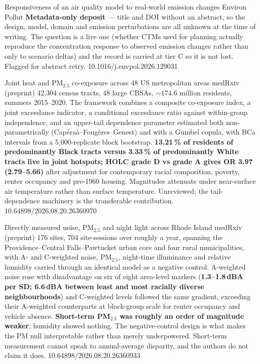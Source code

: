 \documentclass[10pt]{article}
\begin{document}
{Responsiveness of an air quality model to real-world emission changes}
{Environ Pollut}
{\textbf{Metadata-only deposit} --- title and DOI without an abstract, so the design,
model, domain and emission perturbations are all unknown at the time of writing. The
question is a live one (whether CTMs used for planning actually reproduce the
concentration response to observed emission changes rather than only to scenario
deltas) and the record is carried at tier C so it is not lost. Flagged for
abstract retry.}
{10.1016/j.envpol.2026.129031}


{Joint heat and PM$_{2.5}$ co-exposure across 48 US metropolitan areas}
{medRxiv (preprint)}
{42,304 census tracts, 48 large CBSAs, ${\sim}174.6$ million residents, summers
2015--2020. The framework combines a composite co-exposure index, a joint exceedance
indicator, a conditional exceedance ratio against within-group independence, and an
upper-tail dependence parameter estimated both non-parametrically
(Cap\'era\`a--Foug\`eres--Genest) and with a Gumbel copula, with BCa intervals from a
5,000-replicate block bootstrap. \textbf{13.21\,\% of residents of predominantly Black
tracts versus 3.33\,\% of predominantly White tracts live in joint hotspots;
HOLC grade D vs grade A gives OR 3.97 (2.79--5.66)} after adjustment for contemporary
racial composition, poverty, renter occupancy and pre-1960 housing. Magnitudes attenuate
under near-surface air temperature rather than surface temperature. Unreviewed;
the tail-dependence machinery is the transferable contribution.}
{10.64898/2026.08.20.26360970}

{Directly measured noise, PM$_{2.5}$ and night light across Rhode Island}
{medRxiv (preprint)}
{176 sites, 704 site-sessions over roughly a year, spanning the Providence--Central
Falls--Pawtucket urban core and four rural municipalities, with A- and C-weighted noise,
PM$_{2.5}$, night-time illuminance and relative humidity carried through an identical
model as a negative control. A-weighted noise rose with disadvantage on six of eight
area-level markers (\textbf{1.3--1.8\,dBA per SD; 6.6\,dBA between least and most
racially diverse neighbourhoods}) and C-weighted levels followed the same gradient,
exceeding their A-weighted counterparts at block-group scale for renter occupancy and
vehicle absence. \textbf{Short-term PM$_{2.5}$ was roughly an order of magnitude
weaker}; humidity showed nothing. The negative-control design is what makes the PM
null interpretable rather than merely underpowered. Short-term measurement cannot
speak to annual-average disparity, and the authors do not claim it does.}
{10.64898/2026.08.20.26360933}
\end{document}
